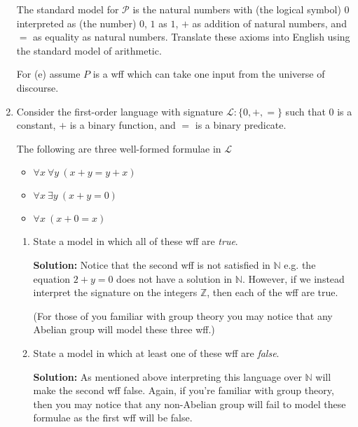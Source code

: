\documentclass[11pt]{report}
\begin{document}
\begin{enumerate}
\begin{enumerate}
		\end{enumerate}
			
			The standard model for $\mathcal{P}$ is the natural numbers with (the logical symbol) $0$ interpreted as (the number) $0$, $1$ as $1$, $+$ as addition of natural numbers, and $=$ as equality as natural numbers. Translate these axioms into English using the standard model of arithmetic. 
			
			For (e) assume $P$ is a wff which can take one input from the universe of discourse. 
			

	\newpage
	\item Consider the first-order language with signature $\mathcal{L}: \{0, +, =\}$ such that $0$ is a constant, $+$ is a binary function, and $=$ is a binary predicate.
			
	The following are three well-formed formulae in $\mathcal{L}$
			
		\begin{itemize}
			\item $\forall x \ \forall y \ (x + y = y + x)$
			\item $\forall x \ \exists y \ (x + y = 0)$
			\item $\forall x \ (x + 0 = x)$
		\end{itemize}
		
		\begin{enumerate}
			\item State a model in which all of these wff are \textit{true}. 
			
			{\bf Solution:} Notice that the second wff is not satisfied in $\mathbb{N}$ e.g. the equation $2+y=0$ does not have a solution in $\mathbb{N}$. However, if we instead interpret the signature on the integers $\mathbb{Z}$, then each of the wff are true. 			

			(For those of you familiar with group theory you may notice that any Abelian group will model these three wff.)

			\item State a model in which at least one of these wff are \textit{false}.
			
			{\bf Solution:} As mentioned above interpreting this language over $\mathbb{N}$ will make the second wff false. Again, if you're familiar with group theory, then you may notice that any non-Abelian group will fail to model these formulae as the first wff will be false. 

	  \end{enumerate}

\end{enumerate}
	
\end{document}

